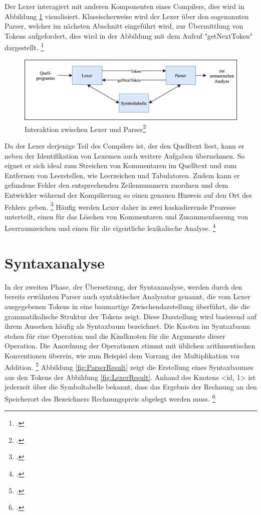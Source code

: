 Der Lexer interagiert mit anderen Komponenten eines Compilers,  dies wird in Abbildung \ref{fig:LexerInteraktionen} visualisiert.  Klassischerweise wird der Lexer über den sogenannten Parser, welcher im nächsten Abschnitt eingeführt wird,  zur Übermittlung von Tokens aufgefordert,  dies wird in der Abbildung mit dem Aufruf "getNextToken" dargestellt.  \footcite[Vgl.][S. 135]{Ullmann2008} 

\begin{figure}[!ht]
 \includegraphics[width=\textwidth,keepaspectratio]{Images/Compiler/LexerParser.png}
 \caption[Interaktion zwischen Lexer und Parser]{Interaktion zwischen Lexer und Parser\protect\footcite{Ullmann2008}}
 \label{fig:LexerInteraktionen}
\end{figure}

Da der Lexer derjenige Teil des Compilers ist, der den Quelltext liest, kann er neben der Identifikation von Lexemen auch weitere Aufgaben übernehmen. So eignet er sich ideal zum Streichen von Kommentaren im Quelltext und zum Entfernen von Leerstellen,  wie Leerzeichen und Tabulatoren.  Zudem kann er gefundene Fehler den entsprechenden Zeilennummern zuordnen und dem Entwickler während der Kompilierung so einen genauen Hinweis auf den Ort des Fehlers geben.  \footcite[Vgl.][S. 135.]{Ullmann2008} 
Häufig werden Lexer daher in zwei kaskadierende Prozesse unterteilt, einen für das Löschen von Kommentaren und Zusammenfassung von Leerraumzeichen und einen für die eigentliche lexikalische Analyse.  \footcite[Vgl.][S. 136.]{Ullmann2008} 

\section{Syntaxanalyse}
In der zweiten Phase, der Übersetzung, der Syntaxanalyse,  werden durch den bereits erwähnten Parser auch syntaktischer Analysator genannt,  die vom Lexer ausgegebenen Tokens in eine baumartige Zwischendarstellung überführt, die die grammatikalische Struktur der Tokens zeigt.  Diese Darstellung wird basierend auf ihrem Aussehen häufig als Syntaxbaum bezeichnet.  Die Knoten im Syntaxbaum stehen für eine Operation und die Kindknoten für die Argumente dieser Operation.  Die Anordnung der Operationen stimmt mit üblichen arithmentischen Konventionen überein,  wie zum Beispiel dem Vorrang der Multiplikation vor Addition. \footcite[Vgl.][S. 9]{Ullmann2008} Abbildung \ref{fig:ParserResult} zeigt die Erstellung eines Syntaxbaumes aus den Tokens  der Abbildung  \ref{fig:LexerResult}.  Anhand des Knotens <id, 1> ist jederzeit über die Symboltabelle bekannt,  dass das Ergebnis der Rechnung an den Speicherort des Bezeichners Rechnungspreis abgelegt werden muss. \footcite[Vgl.][S. 9.]{Ullmann2008} 

